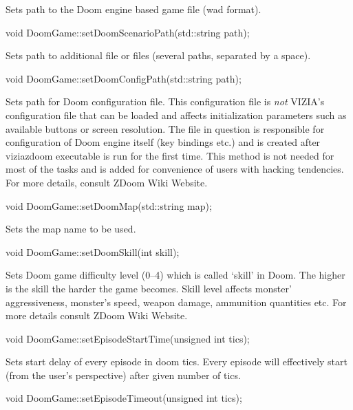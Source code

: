 \documentclass[english,bachelor,a4paper,twoside]{ppfcmthesis}
\begin{document}
Sets path to the Doom engine based game file (wad format).


\vspace{20pt}
\begin{clinee}
void DoomGame::setDoomScenarioPath(std::string path);
\end{clinee}
	Sets path to additional file or files (several paths, separated by a space).


\vspace{20pt}
\begin{clinee}
void DoomGame::setDoomConfigPath(std::string path);
\end{clinee}
	Sets path for Doom configuration file. This configuration file is \emph{not} VIZIA's configuration file that can be loaded and affects initialization parameters such as available buttons or screen resolution. The file in question is responsible for configuration of Doom engine itself (key bindings etc.) and is created after viziazdoom executable is run for the first time. This method is not needed for most of the tasks and is added for convenience of users with hacking tendencies. For more details, consult ZDoom Wiki Website\cite{zdoom-wiki}.


\vspace{20pt}
\begin{clinee}
void DoomGame::setDoomMap(std::string map);
\end{clinee}
	Sets the map name to be used.


\vspace{20pt}
\begin{clinee}      
void DoomGame::setDoomSkill(int skill);
\end{clinee}
	Sets Doom game difficulty level (0--4) which is called `skill' in Doom. The higher is the skill the harder the game becomes. Skill level affects monster' aggressiveness, monster's speed, weapon damage, ammunition quantities etc. For more details consult ZDoom Wiki Website\cite{zdoom-wiki}.


\vspace{20pt}
\begin{clinee}    
void DoomGame::setEpisodeStartTime(unsigned int tics);
\end{clinee}

Sets start delay of every episode in doom tics. Every episode will effectively start (from the user's perspective) after given number of tics.


\vspace{20pt}
\begin{clinee}
void DoomGame::setEpisodeTimeout(unsigned int tics);
\end{clinee}
\end{document}
